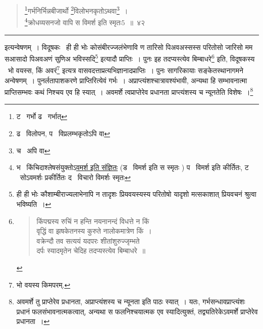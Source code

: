 \documentclass[11pt, openany]{book}
\begin{document}

\newpage
\lfoot{}

\begin{quote}
{\na \renewcommand{\thefootnote}{1}\footnote{ट \textendash\ गर्भो ढ \textendash\ गर्भात्}गर्भनिर्भिन्नबीजार्थो \renewcommand{\thefootnote}{2}\footnote{ढ \textendash\ विलोपन, प \textendash\ विप्रलम्भकृतोऽपि वा}विलोभनकृतोऽथवा\renewcommand{\thefootnote}{3}\footnote{च \textendash\ अपि वा}~।\\
\renewcommand{\thefootnote}{4}\footnote{भ \textendash\ किंचिदाश्लेषसंयुक्तोऽ\underline{वमर्श इति संज्ञितः} (ड \textendash\ विमर्श इति स स्मृतः ) प \textendash\ विमर्श इति कीर्तितः, ट \textendash\ सोऽवमर्शः प्रकीर्तितः द \textendash\ विचारो विमर्शः स्मृतः}क्रोधव्यसनजो वापि स विमर्श इति स्मृतः5~॥~४२}
\end{quote}

\hrule

\vspace{2mm}
\noindent
इत्यन्वेषणम्~। विदूषकः \textendash\ ही ही भोः कोसंबीरज्जलंभेणावि ण तारिसो पिअवअस्सस्स परितोसो जारिसो मम सआसादो पिअवअणं सुणिअ भविस्सदि\renewcommand{\thefootnote}{*}\footnote{ही ही भोः कौशाम्बीराज्यलाभेनापि न तादृशः प्रियवयस्यस्य परितोषो यादृशो मत्सकाशात् प्रियवचनं श्रुत्वा भविष्यति~।} इत्यादौ प्राप्तिः~। पुनः {\qt इह तदप्यस्त्येव बिम्बाधरे\renewcommand{\thefootnote}{$\dagger$}\footnote{\begin{quote}
{\qt किंपद्मस्य रुचिं न हन्ति नयनानन्दं विधत्ते न किं\\
वृद्धिं वा झषकेतनस्य कुरुते नालोकमात्रेण किं~।\\
वक्रेन्दौ तव सत्ययं यदपरः शीतांशुरुज्जृम्भते\\
दर्पः स्यादमृतेन चेदिह तदप्यस्त्येव बिम्बाधरे~॥}
\end{quote}}} इति, विदूषकस्य \textendash\ {\qt भो वयस्स, किं अवरं}\renewcommand{\thefootnote}{$\ddagger$}\footnote{भो वयस्य किमपरम्.} इत्यत्र वासवदत्ताप्रत्यभिज्ञानादप्राप्तिः~। पुनः सागरिकायाः सङ्केतस्थानागमने अन्वेषणम्~। पुनर्लतापाशकरणे प्राप्तिरित्येवं गर्भः~। अप्राप्त्यंशश्चात्रावश्यंभावी, अन्यथा हि सम्भावनात्मा प्राप्तिसम्भवः कथं निश्चय एव हि स्यात्~। अवमर्शे त्वप्राप्तेरेव प्रधानता प्राप्त्यंशस्य च न्यूनतेति विशेषः~।\renewcommand{\thefootnote}{$\oint$}\footnote{{\qt अवमर्शे तु प्राप्तेरेव प्रधानता, अप्राप्त्यंशस्य च न्यूनता} इति पाठः स्यात्~। यतः, गर्भसन्धावप्राप्त्यंशः प्रधानं फलसंभावनात्मकत्वात्, अन्यथा स फलनिश्चयात्मक एव स्यादित्युक्तं, तद्व्यतिरेकेऽवमर्शे प्राप्तेरेव प्रधानता~।}\\
\end{document}
